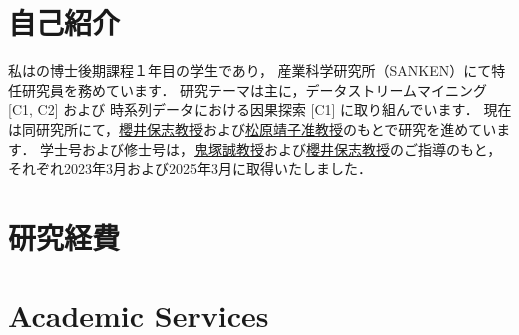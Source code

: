 \documentclass[9pt,a4paper]{article}
\begin{document}

\vspace{-1.0em}


\vspace{-1.5em}

\section{自己紹介}
  \vspace{1.0em}
  私は\OU の博士後期課程１年目の学生であり，
  産業科学研究所（SANKEN）にて特任研究員を務めています．
  研究テーマは主に，データストリームマイニング [C1, C2] および
  時系列データにおける因果探索 [C1] に取り組んでいます．
  現在は同研究所にて，\href{\YSakuraiURL}{櫻井保志教授}および\href{\YMatsubaraURL}{松原靖子准教授}のもとで研究を進めています．
  学士号および修士号は，\href{\MOnizukaURL}{鬼塚誠教授}および\href{\YSakuraiURL}{櫻井保志教授}のご指導のもと，それぞれ2023年3月および2025年3月に取得いたしました．
  \vspace{0.2em}
  \\
  

\section{\Education}
  

\section{\Experience}
  

\section{\Awards}
  

\section{研究経費}

\begin{EntriesTableRight}
\end{EntriesTableRight}

\section{\Publications}
  

\section{Academic Services}
  
\end{document}
